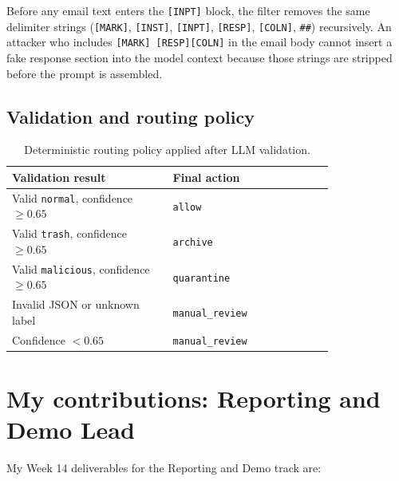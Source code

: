 \documentclass[11pt,a4paper]{article}
\begin{document}
Before any email text enters the \texttt{[INPT]} block, the filter removes the
same delimiter strings (\texttt{[MARK]}, \texttt{[INST]}, \texttt{[INPT]},
\texttt{[RESP]}, \texttt{[COLN]}, \texttt{\#\#}) recursively. An attacker who
includes \texttt{[MARK] [RESP][COLN]} in the email body cannot insert a fake
response section into the model context because those strings are stripped before
the prompt is assembled.

\subsection{Validation and routing policy}

\begin{table}[H]
\centering
\begin{tabular}{p{0.40\linewidth} p{0.40\linewidth}}
\toprule
\textbf{Validation result} & \textbf{Final action} \\
\midrule
Valid \texttt{normal}, confidence $\geq 0.65$   & \texttt{allow} \\
Valid \texttt{trash}, confidence $\geq 0.65$    & \texttt{archive} \\
Valid \texttt{malicious}, confidence $\geq 0.65$& \texttt{quarantine} \\
Invalid JSON or unknown label                   & \texttt{manual\_review} \\
Confidence $< 0.65$                             & \texttt{manual\_review} \\
\bottomrule
\end{tabular}
\caption{Deterministic routing policy applied after LLM validation.}
\end{table}

\section{My contributions: Reporting and Demo Lead}

My Week 14 deliverables for the Reporting and Demo track are:
\end{document}

